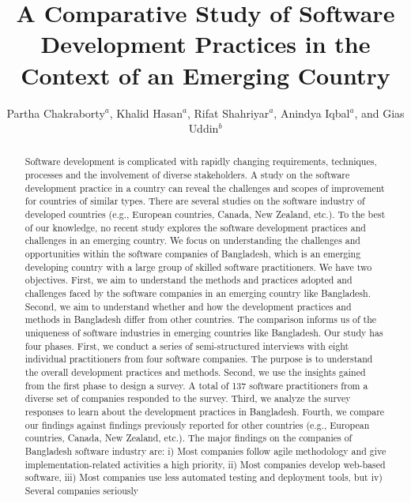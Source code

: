 \documentclass[review]{elsarticle}
\title{A Comparative Study of Software Development Practices in the Context of an Emerging Country}
\def\it{\textit}
\newcounter{finding_counter}
\begin{document}
\begin{frontmatter}



\author{Partha Chakraborty$^a$, Khalid Hasan$^a$, Rifat Shahriyar$^a$, Anindya Iqbal$^a$, and Gias Uddin$^b$}
\address{$^a$Bangladesh University of Engineering and Technology and $^b$University of Calgary}
\begin{abstract}%
Software development is complicated with rapidly changing requirements, techniques, processes and 
the involvement of diverse stakeholders. 
A study on the software development practice in a country
can reveal the challenges and scopes of improvement for countries of similar types. There are several studies on the software industry
of developed countries (e.g., European countries, Canada, 
New Zealand, etc.). To the best of our knowledge, no recent study explores the software development practices and challenges
in an emerging country. 
We focus on understanding the challenges and
opportunities within the software companies of Bangladesh, which is an emerging
developing country with a large group of skilled software practitioners. We have
two objectives. First, we aim to understand the methods and practices 
adopted and challenges faced by the software companies in an emerging
country like Bangladesh. Second, we aim  to understand whether and how the development practices
and methods in Bangladesh differ from other countries. The comparison informs us
of the uniqueness of software industries in emerging countries like Bangladesh.
Our study has four phases. First, we conduct a series of
semi-structured interviews with eight individual practitioners from four
software companies. The purpose is to understand the overall development
practices and methods. Second, we use the insights gained from the first phase
to design a survey. A total of 137 software practitioners from a diverse set of
companies responded to the survey. Third, we analyze the survey responses to learn about the development 
practices in Bangladesh. Fourth, we compare our findings against findings previously reported for other countries (e.g., European countries, Canada, 
New Zealand, etc.).
The major findings on the companies of
Bangladesh software industry are: i) Most companies follow agile methodology
and give implementation-related activities a high priority, ii) Most companies
develop web-based software, iii) Most companies use less
automated testing and deployment tools, but iv) Several companies seriously

\end{abstract}
\end{frontmatter}
\end{document}
